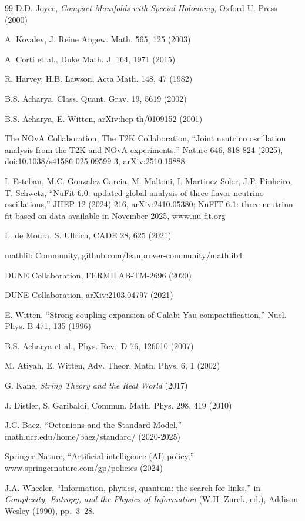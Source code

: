 \begin{thebibliography}{99}
 D.D. Joyce, \emph{Compact Manifolds with Special Holonomy}, Oxford U. Press (2000)

 A. Kovalev, J. Reine Angew. Math. 565, 125 (2003)

 A. Corti et al., Duke Math. J. 164, 1971 (2015)

 R. Harvey, H.B. Lawson, Acta Math. 148, 47 (1982)

 B.S. Acharya, Class. Quant. Grav. 19, 5619 (2002)

 B.S. Acharya, E. Witten, arXiv:hep-th/0109152 (2001)

 The NOvA Collaboration, The T2K Collaboration, ``Joint neutrino oscillation analysis from the T2K and NOvA experiments,'' Nature 646, 818-824 (2025), doi:10.1038/s41586-025-09599-3, arXiv:2510.19888

 I. Esteban, M.C. Gonzalez-Garcia, M. Maltoni, I. Martinez-Soler, J.P. Pinheiro, T. Schwetz, ``NuFit-6.0: updated global analysis of three-flavor neutrino oscillations,'' JHEP 12 (2024) 216, arXiv:2410.05380; NuFIT 6.1: three-neutrino fit based on data available in November 2025, www.nu-fit.org

 L. de Moura, S. Ullrich, CADE 28, 625 (2021)

 mathlib Community, github.com/leanprover-community/mathlib4

 DUNE Collaboration, FERMILAB-TM-2696 (2020)

 DUNE Collaboration, arXiv:2103.04797 (2021)

 E. Witten, ``Strong coupling expansion of Calabi-Yau compactification,'' Nucl. Phys. B 471, 135 (1996)

 B.S. Acharya et al., Phys. Rev.~D 76, 126010 (2007)

 M. Atiyah, E. Witten, Adv. Theor. Math. Phys. 6, 1 (2002)

 G. Kane, \emph{String Theory and the Real World} (2017)

 J. Distler, S. Garibaldi, Commun. Math. Phys. 298, 419 (2010)

 J.C. Baez, ``Octonions and the Standard Model,'' math.ucr.edu/home/baez/standard/ (2020-2025)

 Springer Nature, ``Artificial intelligence (AI) policy,'' www.springernature.com/gp/policies (2024)

 J.A. Wheeler, ``Information, physics, quantum: the search for links,'' in \emph{Complexity, Entropy, and the Physics of Information} (W.H. Zurek, ed.), Addison-Wesley (1990), pp.~3--28.


\end{thebibliography}
